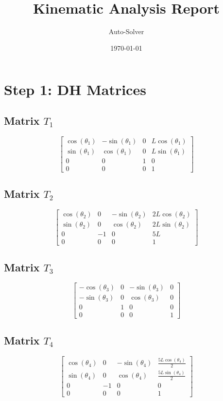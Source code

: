 \documentclass[12pt, a4paper]{article}
\title{\textbf{Kinematic Analysis Report}}
\author{Auto-Solver}
\date{\today}
\begin{document}
\maketitle

\section{Step 1: DH Matrices}
\subsection*{Matrix $T_{1}$}
\[ \left[\begin{matrix}\cos{\left(\theta_{1} \right)} & - \sin{\left(\theta_{1} \right)} & 0 & L \cos{\left(\theta_{1} \right)}\\\sin{\left(\theta_{1} \right)} & \cos{\left(\theta_{1} \right)} & 0 & L \sin{\left(\theta_{1} \right)}\\0 & 0 & 1 & 0\\0 & 0 & 0 & 1\end{matrix}\right] \]
\subsection*{Matrix $T_{2}$}
\[ \left[\begin{matrix}\cos{\left(\theta_{2} \right)} & 0 & - \sin{\left(\theta_{2} \right)} & 2 L \cos{\left(\theta_{2} \right)}\\\sin{\left(\theta_{2} \right)} & 0 & \cos{\left(\theta_{2} \right)} & 2 L \sin{\left(\theta_{2} \right)}\\0 & -1 & 0 & 5 L\\0 & 0 & 0 & 1\end{matrix}\right] \]
\subsection*{Matrix $T_{3}$}
\[ \left[\begin{matrix}- \cos{\left(\theta_{3} \right)} & 0 & - \sin{\left(\theta_{3} \right)} & 0\\- \sin{\left(\theta_{3} \right)} & 0 & \cos{\left(\theta_{3} \right)} & 0\\0 & 1 & 0 & 0\\0 & 0 & 0 & 1\end{matrix}\right] \]
\subsection*{Matrix $T_{4}$}
\[ \left[\begin{matrix}\cos{\left(\theta_{4} \right)} & 0 & - \sin{\left(\theta_{4} \right)} & \frac{5 L \cos{\left(\theta_{4} \right)}}{2}\\\sin{\left(\theta_{4} \right)} & 0 & \cos{\left(\theta_{4} \right)} & \frac{5 L \sin{\left(\theta_{4} \right)}}{2}\\0 & -1 & 0 & 0\\0 & 0 & 0 & 1\end{matrix}\right] \]
\end{document}
